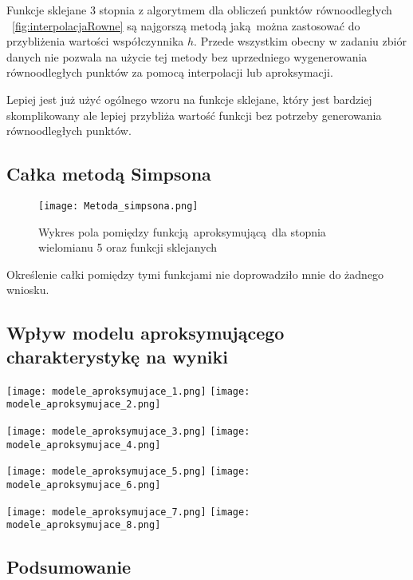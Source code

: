 \documentclass[varwidth,12pt,a4paper]{article}
\begin{document}
Funkcje sklejane 3 stopnia z algorytmem dla obliczeń punktów równoodległych ~\ref{fig:interpolacjaRowne} są najgorszą metodą
jaką można zastosować do przybliżenia wartości współczynnika $h$.
Przede wszystkim obecny w zadaniu zbiór danych nie pozwala na użycie tej metody
bez uprzedniego wygenerowania równoodległych punktów za pomocą interpolacji lub aproksymacji.

Lepiej jest już użyć ogólnego wzoru na funkcje sklejane, który jest bardziej skomplikowany
ale lepiej przybliża wartość funkcji bez potrzeby generowania równoodległych punktów.

\subsection{Całka metodą Simpsona}

\begin{figure}[H]
    \texttt{[image: Metoda\_simpsona.png]} 
    \caption{Wykres pola pomiędzy funkcją aproksymującą dla stopnia wielomianu 5 oraz funkcji sklejanych}
    \label{fig:calkaSimpsona}
\end{figure}

Określenie całki pomiędzy tymi funkcjami nie doprowadziło mnie do żadnego wniosku.

\subsection{Wpływ modelu aproksymującego charakterystykę na wyniki}

\texttt{[image: modele\_aproksymujace\_1.png]}\hspace{0.1\textwidth}%
\texttt{[image: modele\_aproksymujace\_2.png]}\par
\texttt{[image: modele\_aproksymujace\_3.png]}\hspace{0.1\textwidth}%
\texttt{[image: modele\_aproksymujace\_4.png]}\par
\texttt{[image: modele\_aproksymujace\_5.png]}\hspace{0.1\textwidth}%
\texttt{[image: modele\_aproksymujace\_6.png]}\par
\texttt{[image: modele\_aproksymujace\_7.png]}\hspace{0.1\textwidth}%
\texttt{[image: modele\_aproksymujace\_8.png]}\par

\subsection{Podsumowanie}
\end{document}
